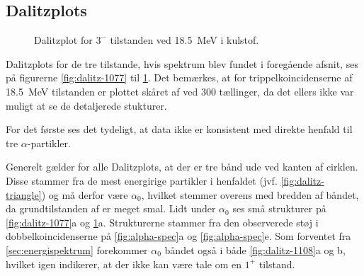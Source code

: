 \subsection{Dalitzplots}
\label{sec:dalitz-plots}

\begin{figure}[ht!]
  \centering
  \vspace{-0.3cm}
  \hfill
  \caption{Dalitzplot for $0^{+}$ tilstanden ved \SI{17.8}{\MeV} i kulstof.}
  \label{fig:dalitz-1077}
  \hfill
  \caption{Dalitzplot for $1^{+}$ tilstanden ved \SI{18.2}{\MeV} i kulstof.}
  \label{fig:dalitz-1108}
  \hfill
  \caption{Dalitzplot for $3^{-}$ tilstanden ved \SI{18.5}{\MeV} i kulstof.}
  \label{fig:dalitz-1128}
  \vspace{-1.3cm}
\end{figure}

Dalitzplots for de tre tilstande, hvis spektrum blev fundet i foregående afsnit, ses på figurerne
\ref{fig:dalitz-1077} til \ref{fig:dalitz-1128}. Det bemærkes, at for trippelkoincidenserne af
\SI{18.5}{\MeV} tilstanden er plottet skåret af ved 300 tællinger, da det ellers ikke var muligt at
se de detaljerede stukturer.

For det første ses det tydeligt, at data ikke er konsistent med direkte henfald til tre
$\alpha$-partikler.

Generelt gælder for alle Dalitzplots, at der er tre bånd ude ved kanten af cirklen. Disse
stammer fra de mest energirige partikler i henfaldet (jvf. \cref{fig:dalitz-triangle}) og må derfor
være $\alpha_{0}$, hvilket stemmer overens med bredden af båndet, da grundtilstanden af \Be er meget
smal. Lidt under $\alpha_{0}$ ses små strukturer på \cref{fig:dalitz-1077}a og
\ref{fig:dalitz-1128}a. Strukturerne stammer fra den observerede støj i dobbelkoincidenserne på
\cref{fig:alpha-spec}a og \ref{fig:alpha-spec}e. Som forventet fra \cref{sec:energispektrum}
forekommer $\alpha_{0}$ båndet også i både \ref{fig:dalitz-1108}a og b, hvilket igen indikerer, at der
ikke kan være tale om en $1^{+}$ tilstand.

